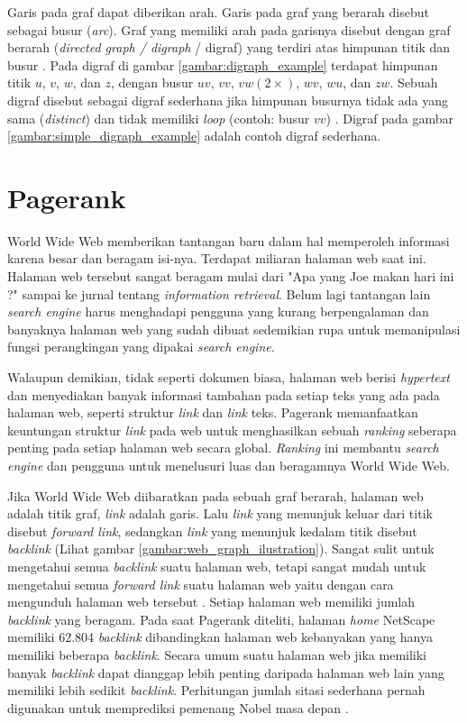 Garis pada graf dapat diberikan arah. Garis pada graf yang berarah disebut sebagai busur (\textit{arc}). Graf yang memiliki arah pada garisnya disebut dengan graf berarah (\textit{directed graph / digraph} / digraf) yang terdiri atas himpunan titik dan busur \citep{wilson1996}. Pada digraf di gambar \ref{gambar:digraph_example} terdapat himpunan titik $u$, $v$, $w$, dan $z$, dengan busur $uv$, $vv$, $vw (2\times)$, $wv$, $wu$, dan $zw$. Sebuah digraf disebut sebagai digraf sederhana jika himpunan busurnya tidak ada yang sama (\textit{distinct}) dan tidak memiliki \textit{loop} (contoh: busur $vv$) \citep{wilson1996}. Digraf pada gambar \ref{gambar:simple_digraph_example} adalah contoh digraf sederhana.

\section{Pagerank}

World Wide Web memberikan tantangan baru dalam hal memperoleh informasi karena besar dan beragam isi-nya. Terdapat miliaran halaman web saat ini. Halaman web tersebut sangat beragam mulai dari "Apa yang Joe makan hari ini ?" sampai ke jurnal tentang \textit{information retrieval}. Belum lagi tantangan lain \textit{search engine} harus menghadapi pengguna yang kurang berpengalaman dan banyaknya halaman web yang sudah dibuat sedemikian rupa untuk memanipulasi fungsi perangkingan yang dipakai \textit{search engine}.

Walaupun demikian, tidak seperti dokumen biasa, halaman web berisi \textit{hypertext} dan menyediakan banyak informasi tambahan pada setiap teks yang ada pada halaman web, seperti struktur \textit{link} dan \textit{link} teks. Pagerank memanfaatkan keuntungan struktur \textit{link} pada web untuk menghasilkan sebuah \textit{ranking} seberapa penting pada setiap halaman web secara global. \textit{Ranking} ini membantu \textit{search engine} dan pengguna untuk menelusuri luas dan beragamnya World Wide Web.

Jika World Wide Web diibaratkan pada sebuah graf berarah, halaman web adalah titik graf, \textit{link} adalah garis. Lalu \textit{link} yang menunjuk keluar dari titik disebut \textit{forward link}, sedangkan \textit{link} yang menunjuk kedalam titik disebut \textit{backlink} (Lihat gambar \ref{gambar:web_graph_ilustration}). Sangat sulit untuk mengetahui semua \textit{backlink} suatu halaman web, tetapi sangat mudah untuk mengetahui semua \textit{forward link} suatu halaman web yaitu dengan cara mengunduh halaman web tersebut \citep{ilprints422}. Setiap halaman web memiliki jumlah \textit{backlink} yang beragam. Pada saat Pagerank diteliti, halaman \textit{home} NetScape memiliki 62.804 \textit{backlink} dibandingkan halaman web kebanyakan yang hanya memiliki beberapa \textit{backlink}. Secara umum suatu halaman web jika memiliki banyak \textit{backlink} dapat dianggap lebih penting daripada halaman web lain yang memiliki lebih sedikit \textit{backlink}. Perhitungan jumlah sitasi sederhana pernah digunakan untuk memprediksi pemenang Nobel masa depan \citep{ilprints422}. 

